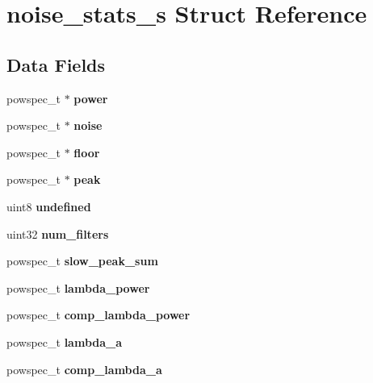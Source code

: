 \section{noise\-\_\-stats\-\_\-s Struct Reference}
\label{structnoise__stats__s}
\subsection*{Data Fields}
\begin{DoxyCompactItemize}
\item 
powspec\-\_\-t $\ast$ {\bfseries power}\label{structnoise__stats__s_a3352c66489d54b578e5f43cc646951dc}

\item 
powspec\-\_\-t $\ast$ {\bfseries noise}\label{structnoise__stats__s_ab21b71b8202302859b120b08b42bb4bb}

\item 
powspec\-\_\-t $\ast$ {\bfseries floor}\label{structnoise__stats__s_aea4aaa0528b85a2989743afee3f21964}

\item 
powspec\-\_\-t $\ast$ {\bfseries peak}\label{structnoise__stats__s_a36e6b3a83014d30755b763fa8575a35d}

\item 
uint8 {\bfseries undefined}\label{structnoise__stats__s_a84138e0f5dd6bc3c8049cce8ea815678}

\item 
uint32 {\bfseries num\-\_\-filters}\label{structnoise__stats__s_ad5b17abb96cc825153b41f1506018c3c}

\item 
powspec\-\_\-t {\bfseries slow\-\_\-peak\-\_\-sum}\label{structnoise__stats__s_a9038ab6afc8ff2df63952cc16d032f0d}

\item 
powspec\-\_\-t {\bfseries lambda\-\_\-power}\label{structnoise__stats__s_aae414a12fd0b4b8be3a61468fe15f3de}

\item 
powspec\-\_\-t {\bfseries comp\-\_\-lambda\-\_\-power}\label{structnoise__stats__s_a7d2228c947b372142346861adbf16acb}

\item 
powspec\-\_\-t {\bfseries lambda\-\_\-a}\label{structnoise__stats__s_a804b3c775a7d80c95a2a53e9eb0d6b3a}

\item 
powspec\-\_\-t {\bfseries comp\-\_\-lambda\-\_\-a}\label{structnoise__stats__s_a047be8fb044da7e3a3f45b78e9d5de23}


\end{DoxyCompactItemize}
